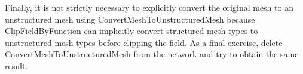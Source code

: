 \documentclass[fleqn,11pt,openany]{book}
\begin{document}
Finally, it is not strictly necessary to explicitly convert the original mesh to an unstructured mesh using ConvertMeshToUnstructuredMesh because ClipFieldByFunction can implicitly convert structured mesh types to unstructured mesh types before clipping the field.
As a final exercise, delete ConvertMeshToUnstructuredMesh from the network and try to obtain the same result.
\end{document}
